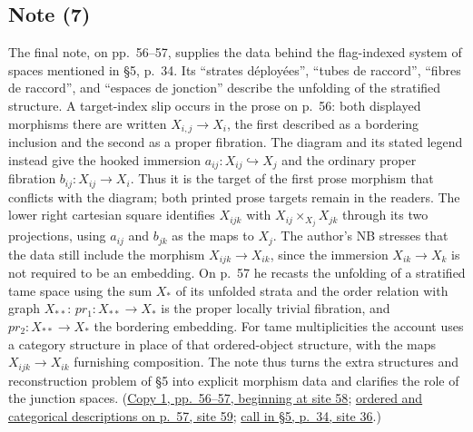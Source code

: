 \subsection*{Note (7)}
The final note, on pp.~56--57, supplies the data behind the flag-indexed
system of spaces mentioned in \S5, p.~34. Its ``strates déployées'',
``tubes de raccord'', ``fibres de raccord'', and ``espaces de jonction''
describe the unfolding of the stratified structure. A target-index slip
occurs in the prose on p.~56: both displayed morphisms there are written
$X_{i,j}\longrightarrow X_i$, the first described as a bordering inclusion
and the second as a proper fibration. The diagram and its stated legend
instead give the hooked immersion
$a_{ij}:X_{ij}\hookrightarrow X_j$ and the ordinary proper fibration
$b_{ij}:X_{ij}\longrightarrow X_i$. Thus it is the target of the first
prose morphism that conflicts with the diagram; both printed prose
targets remain in the readers. The lower right cartesian square identifies
$X_{ijk}$ with $X_{ij}\times_{X_j}X_{jk}$ through its two projections,
using $a_{ij}$ and $b_{jk}$ as the maps to $X_j$. The author's NB stresses
that the data still include the morphism
$X_{ijk}\longrightarrow X_{ik}$, since the immersion
$X_{ik}\longrightarrow X_k$ is not required to be an embedding. On p.~57
he recasts the unfolding of a stratified tame space using the sum $X_*$
of its unfolded strata and the order relation with graph $X_{**}$:
$pr_1:X_{**}\longrightarrow X_*$ is the proper locally trivial fibration,
and $pr_2:X_{**}\longrightarrow X_*$ the bordering embedding. For tame
multiplicities the account uses a category structure in place of that
ordered-object structure, with the maps
$X_{ijk}\longrightarrow X_{ik}$ furnishing composition. The note thus
turns the extra structures and reconstruction problem of \S5 into
explicit morphism data and clarifies the role of the junction spaces.
(\href{https://grothendieck.umontpellier.fr/web/viewer.html?file=../119.pdf\#page=59}{Copy 1, pp.~56--57, beginning at site 58};
\href{https://grothendieck.umontpellier.fr/web/viewer.html?file=../119.pdf\#page=60}{ordered and categorical descriptions on p.~57, site 59};
\href{https://grothendieck.umontpellier.fr/web/viewer.html?file=../119.pdf\#page=37}{call in \S5, p.~34, site 36}.)
